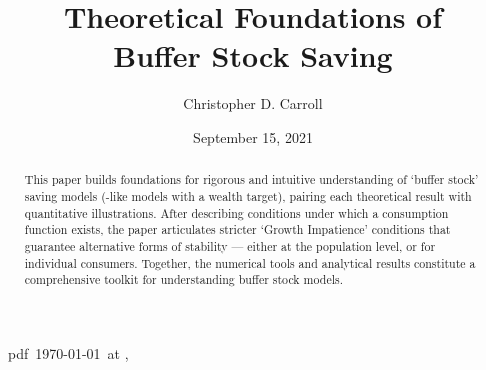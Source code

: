 \documentclass[BufferStockTheory]{subfiles}
\begin{document}
\providecommand{\versn}{pdf} %
\ifthenelse{\boolean{Web}}{    %
  \renewcommand{\versn}{Web}     %
  \renewcommand{\rootFromOut}{.} %
}{}  %

\hfill{\tiny \jobname~\versn~\today~{at} \DTMcurrenttime, ~~}

\title{Theoretical Foundations of \\ Buffer Stock Saving}

\author{Christopher D. Carroll\authNum}



\renewcommand{\forcedate}{September 15, 2021}\date{\forcedate}

\maketitle
\hypertarget{abstract}{}
\begin{abstract}
This paper builds foundations for rigorous and intuitive understanding of `buffer stock' saving models (\cite{bewleyPIH}-like models with a wealth target), pairing each theoretical result with quantitative illustrations.  After describing conditions under which a consumption function exists, the paper articulates stricter `Growth Impatience' conditions that guarantee alternative forms of stability --- either at the population level, or for individual consumers.  Together, the numerical tools and analytical results constitute a comprehensive toolkit for understanding buffer stock models.
\end{abstract}


\hypertarget{links}{}
\end{document}
